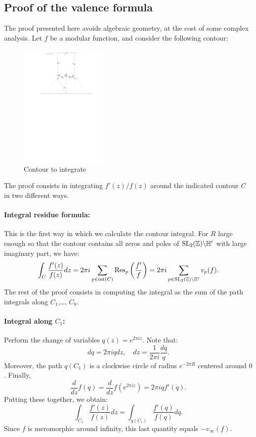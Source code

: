 \subsection{Proof of the valence formula}
The proof presented here avoids algebraic geometry, at the cost of some complex analysis. Let
$f$ be a modular function, and consider the following contour:
\begin{figure}[h]
  \centering
  \includegraphics[height=6cm]{contour.pdf}
  \caption{Contour to integrate}
  \label{fig:contour}
\end{figure}

The proof consists in integrating $f'(z)/f(z)$ around the indicated contour $C$ in two different ways.
\paragraph{Integral residue formula:} This is the first way in which we calculate the contour integral. For $R$ large enough so that the contour contains all zeros and poles of $\operatorname{SL}_2(\mathbb{Z})\backslash\mathbb{H}'$ with large imaginary part, we have:
\[
\int_C \frac{f'(z)}{f(z)}dz = 2\pi i \sum_{p\in\operatorname{int}(C)} \operatorname{Res}_p\left(\frac{f'}{f}\right) = 2\pi i\sum_{p\in \operatorname{SL}_2(\mathbb{Z})\backslash\mathbb{H}'} v_p(f).
\]
The rest of the proof consists in computing the integral as the sum of the path integrals along $C_1$,\ldots, $C_8$.
\paragraph{Integral along $C_1$:} Perform the change of variables $q(z)=e^{2\pi i z}$. Note that:
\[
dq = 2\pi i qdz,\quad dz = \frac{1}{2\pi i}\frac{dq}{q}.
\]
Moreover, the path $q(C_1)$ is a clockwise circle of radius $e^{-2\pi R}$ centered around $0$. Finally,
\[
\frac{d}{dz}f(q) = \frac{d}{dz} f(e^{2\pi i z}) = 2\pi i q f'(q).
\]
Putting these together, we obtain:
\[
\int_{C_1}\frac{f'(z)}{f(z)}dz = \int_{q(C_1)} \frac{f'(q)}{f(q)} dq.
\]
Since $f$ is meromorphic around infinity, this last quantity equals $- v_\infty(f)$.

